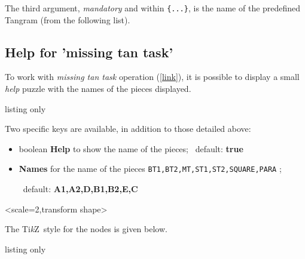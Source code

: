 \documentclass{article}
\providecommand\tikzlogo{Ti\textit{k}Z}
\let\TikZ\tikzlogo
\newcommand\Cle[1]{{\bfseries\sffamily\textlangle #1\textrangle}}
\begin{document}
The third argument, \textit{mandatory} and within \texttt{\{...\}}, is the name of the predefined Tangram (from the following list).

\pagebreak

\subsection{Help for 'missing tan task'}

To work with \textit{missing tan task} operation (\href{https://www.researchgate.net/publication/371039854_Comparing_Mental_Effort_Difficulty_and_Confidence_Appraisals_in_Problem-Solving_A_Metacognitive_Perspective}{[link]}), it is possible to display a small \textit{help} puzzle with the names of the pieces displayed.

\begin{PresentationCode}{listing only}
\end{PresentationCode}

Two specific keys are available, in addition to those detailed above:

\begin{itemize}
	\item boolean \Cle{Help} to show the name of the pieces; \hfill~default: \Cle{true}
	\item \Cle{Names} for the name of the pieces \texttt{BT1,BT2,MT,ST1,ST2,SQUARE,PARA} ;
	
	\hfill~default: \Cle{A1,A2,D,B1,B2,E,C}
\end{itemize}

\begin{PresentationCode}{}
\TangramTikzHelp[Solution]
\end{PresentationCode}

\begin{PresentationCode}{}
\TangramTikzHelp[Solution,Color=teal]<scale=2,transform shape>
\end{PresentationCode}

\begin{PresentationCode}{}
\TangramTikzHelp[ColorList,Help=false]
\end{PresentationCode}

The \TikZ\ style for the nodes is given below.

\begin{PresentationCode}{listing only}
\end{PresentationCode}
\end{document}
